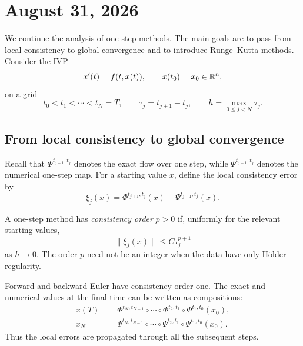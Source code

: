 \section{August 31, 2026}

We continue the analysis of one-step methods. The main goals are to pass
from local consistency to global convergence and to introduce
Runge--Kutta methods. Consider the IVP
\[
  x'(t)=f(t,x(t)),
  \qquad
  x(t_0)=x_0\in\mathbb{R}^n,
\]
on a grid
\[
  t_0<t_1<\cdots<t_N=T,
  \qquad
  \tau_j=t_{j+1}-t_j,
  \qquad
  h=\max_{0\leq j<N}\tau_j.
\]

\subsection{From local consistency to global convergence}

Recall that \(\Phi^{t_{j+1},t_j}\) denotes the exact flow over one
step, while \(\Psi^{t_{j+1},t_j}\) denotes the numerical one-step map.
For a starting value \(x\), define the local consistency error by
\begin{equation}\label{eq:local-error-aug-31}
  \xi_j(x)
  =\Phi^{t_{j+1},t_j}(x)
   -\Psi^{t_{j+1},t_j}(x).
\end{equation}

\begin{definition}
  A one-step method has \emph{consistency order} \(p>0\) if, uniformly
  for the relevant starting values,
  \[
    \lVert\xi_j(x)\rVert\leq C\tau_j^{p+1}
  \]
  as \(h\to0\). The order \(p\) need not be an integer when the data
  have only H\"older regularity.
\end{definition}

Forward and backward Euler have consistency order one. The exact and
numerical values at the final time can be written as compositions:
\begin{align*}
  x(T)
  &=\Phi^{t_N,t_{N-1}}\circ\cdots\circ
    \Phi^{t_2,t_1}\circ\Phi^{t_1,t_0}(x_0),\\
  x_N
  &=\Psi^{t_N,t_{N-1}}\circ\cdots\circ
    \Psi^{t_2,t_1}\circ\Psi^{t_1,t_0}(x_0).
\end{align*}
Thus the local errors are propagated through all the subsequent steps.

